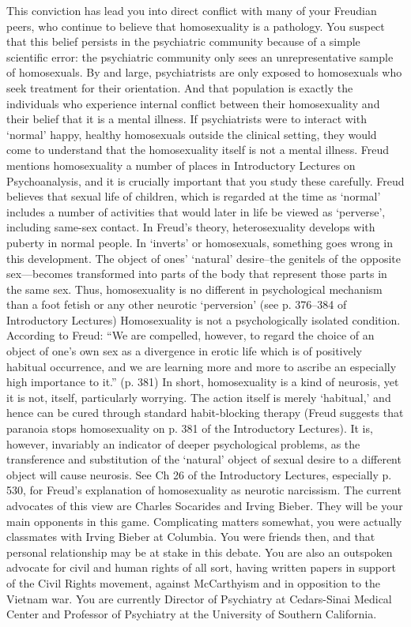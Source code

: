 This conviction has lead you into direct conflict with many of your Freudian peers, who continue to believe that homosexuality is a pathology. You suspect that this belief persists in the psychiatric community because of a simple scientific error: the psychiatric community only sees an unrepresentative sample of homosexuals. By and large, psychiatrists are only exposed to homosexuals who seek treatment for their orientation. And that population is exactly the individuals who experience internal conflict between their homosexuality and their belief that it is a mental illness. If psychiatrists were to interact with `normal' happy, healthy homosexuals outside the clinical setting, they would come to understand that the homosexuality itself is not a mental illness.
Freud mentions homosexuality a number of places in Introductory Lectures on Psychoanalysis, and it is crucially important that you study these carefully. Freud believes that sexual life of children, which is regarded at the time as `normal' includes a number of activities that would later in life be viewed as `perverse', including same-sex contact. In Freud's theory, heterosexuality develops with puberty in normal people. In `inverts' or homosexuals, something goes wrong in this development. The object of ones' `natural' desire--the genitels of the opposite sex—becomes transformed into parts of the body that represent those parts in the same sex. Thus, homosexuality is no different in psychological mechanism than a foot fetish or any other neurotic `perversion' (see p. 376--384 of Introductory Lectures) Homosexuality is not a psychologically isolated condition. According to Freud:
“We are compelled, however, to regard the choice of an object of one's own sex as a divergence in erotic life which is of positively habitual occurrence, and we are learning more and more to ascribe an especially high importance to it.” (p. 381)
In short, homosexuality is a kind of neurosis, yet it is not, itself, particularly worrying. The action itself is merely `habitual,' and hence can be cured through standard habit-blocking therapy (Freud suggests that paranoia stops homosexuality on p. 381 of the Introductory Lectures). It is, however, invariably an indicator of deeper psychological problems, as the transference and substitution of the `natural' object of sexual desire to a different object will cause neurosis. See Ch 26 of the Introductory Lectures, especially p. 530, for Freud's explanation of homosexuality as neurotic narcissism.
The current advocates of this view are Charles Socarides and Irving Bieber. They will be your main opponents in this game. Complicating matters somewhat, you were actually classmates with Irving Bieber at Columbia. You were friends then, and that personal relationship may be at stake in this debate.
You are also an outspoken advocate for civil and human rights of all sort, having written papers in support of the Civil Rights movement, against McCarthyism and in opposition to the Vietnam war.
You are currently Director of Psychiatry at Cedars-Sinai Medical Center and Professor of Psychiatry at the University of Southern California.

